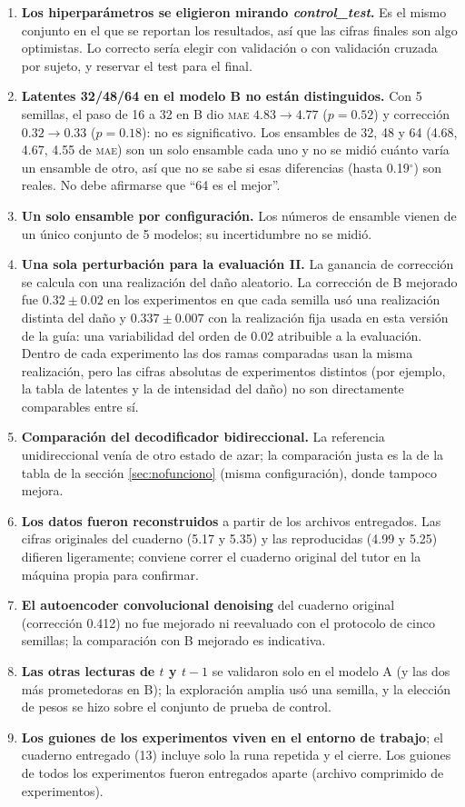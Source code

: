 \documentclass[11pt,a4paper]{article}
\newcommand{\gr}{$^\circ$}
\newcommand{\mae}{\textsc{mae}}
\begin{document}
\begin{enumerate}
\item \textbf{Los hiperparámetros se eligieron mirando \emph{control\_test}.} Es el mismo conjunto en el que se reportan los resultados, así que las cifras finales son algo optimistas. Lo correcto sería elegir con validación o con validación cruzada por sujeto, y reservar el test para el final.
\item \textbf{Latentes 32/48/64 en el modelo B no están distinguidos.} Con 5 semillas, el paso de 16 a 32 en B dio \mae{} $4.83\to4.77$ ($p=0.52$) y corrección $0.32\to0.33$ ($p=0.18$): no es significativo. Los ensambles de 32, 48 y 64 (4.68, 4.67, 4.55 de \mae{}) son un solo ensamble cada uno y no se midió cuánto varía un ensamble de otro, así que no se sabe si esas diferencias (hasta 0.19\gr) son reales. No debe afirmarse que ``64 es el mejor''.
\item \textbf{Un solo ensamble por configuración.} Los números de ensamble vienen de un único conjunto de 5 modelos; su incertidumbre no se midió.
\item \textbf{Una sola perturbación para la evaluación II.} La ganancia de corrección se calcula con una realización del daño aleatorio. La corrección de B mejorado fue $0.32\pm0.02$ en los experimentos en que cada semilla usó una realización distinta del daño y $0.337\pm0.007$ con la realización fija usada en esta versión de la guía: una variabilidad del orden de 0.02 atribuible a la evaluación. Dentro de cada experimento las dos ramas comparadas usan la misma realización, pero las cifras absolutas de experimentos distintos (por ejemplo, la tabla de latentes y la de intensidad del daño) no son directamente comparables entre sí.
\item \textbf{Comparación del decodificador bidireccional.} La referencia unidireccional venía de otro estado de azar; la comparación justa es la de la tabla de la sección \ref{sec:nofunciono} (misma configuración), donde tampoco mejora.
\item \textbf{Los datos fueron reconstruidos} a partir de los archivos entregados. Las cifras originales del cuaderno (5.17 y 5.35) y las reproducidas (4.99 y 5.25) difieren ligeramente; conviene correr el cuaderno original del tutor en la máquina propia para confirmar.
\item \textbf{El autoencoder convolucional denoising} del cuaderno original (corrección 0.412) no fue mejorado ni reevaluado con el protocolo de cinco semillas; la comparación con B mejorado es indicativa.
\item \textbf{Las otras lecturas de $t$ y $t-1$} se validaron solo en el modelo A (y las dos más prometedoras en B); la exploración amplia usó una semilla, y la elección de pesos se hizo sobre el conjunto de prueba de control.
\item \textbf{Los guiones de los experimentos viven en el entorno de trabajo}; el cuaderno entregado (13) incluye solo la runa repetida y el cierre. Los guiones de todos los experimentos fueron entregados aparte (archivo comprimido de experimentos).
\end{enumerate}
\end{document}
